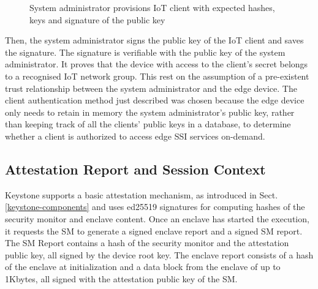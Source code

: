 \begin{figure}[!h]
    \centering
    
    \caption{System administrator provisions IoT client with expected hashes, keys and signature of the public key}
    \label{manufacturer-provisioning}
\end{figure}

Then, the system administrator signs the public key of the IoT client and saves the signature. The signature is verifiable with the public key of the system administrator. It proves that the device with access to the client's secret belongs to a recognised IoT network group. This rest on the assumption of a pre-existent trust relationship between the system administrator and the edge device. The client authentication method just described was chosen because the edge device only needs to retain in memory the system administrator's public key, rather than keeping track of all the clients' public keys in a database, to determine whether a client is authorized to access edge SSI services on-demand.

\subsection{Attestation Report and Session Context}
Keystone supports a basic attestation mechanism, as introduced in Sect. \ref{keystone-components} and uses ed25519 signatures \cite{bernstein2012high} for computing hashes of the security monitor and enclave content. Once an enclave has started the execution, it requests the SM to generate a signed enclave report and a signed SM report. The SM Report contains a hash of the security monitor and the attestation public key, all signed by the device root key. The enclave report consists of a hash of the enclave at initialization and a data block from the enclave of up to 1Kbytes, all signed with the attestation public key of the SM. 

